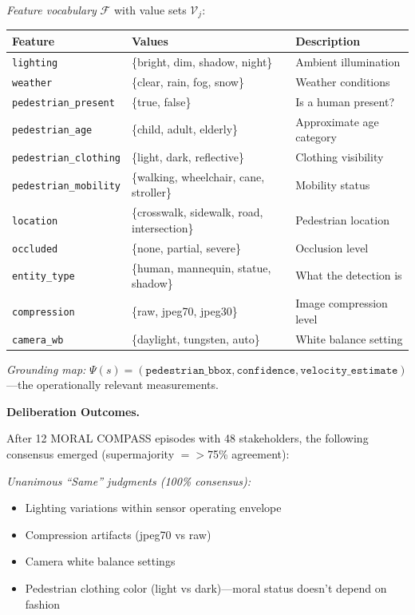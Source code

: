 \documentclass[12pt]{article}
\begin{document}
\emph{Feature vocabulary} $\mathcal{F}$ with value sets $\mathcal{V}_j$:

\begin{table}[h]
\centering
\begin{tabular}{lll}
\toprule
\textbf{Feature} & \textbf{Values} & \textbf{Description} \\
\midrule
\texttt{lighting} & \{bright, dim, shadow, night\} & Ambient illumination \\
\texttt{weather} & \{clear, rain, fog, snow\} & Weather conditions \\
\texttt{pedestrian\_present} & \{true, false\} & Is a human present? \\
\texttt{pedestrian\_age} & \{child, adult, elderly\} & Approximate age category \\
\texttt{pedestrian\_clothing} & \{light, dark, reflective\} & Clothing visibility \\
\texttt{pedestrian\_mobility} & \{walking, wheelchair, cane, stroller\} & Mobility status \\
\texttt{location} & \{crosswalk, sidewalk, road, intersection\} & Pedestrian location \\
\texttt{occluded} & \{none, partial, severe\} & Occlusion level \\
\texttt{entity\_type} & \{human, mannequin, statue, shadow\} & What the detection is \\
\texttt{compression} & \{raw, jpeg70, jpeg30\} & Image compression level \\
\texttt{camera\_wb} & \{daylight, tungsten, auto\} & White balance setting \\
\bottomrule
\end{tabular}
\end{table}

\emph{Grounding map:} $\Psi(s) = (\texttt{pedestrian\_bbox}, \texttt{confidence}, \texttt{velocity\_estimate})$---the operationally relevant measurements.

\textbf{Deliberation Outcomes.}

After 12 MORAL COMPASS episodes with 48 stakeholders, the following consensus emerged
(supermajority $= >$75\% agreement):

\emph{Unanimous ``Same'' judgments (100\% consensus):}
\begin{itemize}
\item Lighting variations within sensor operating envelope
\item Compression artifacts (jpeg70 vs raw)
\item Camera white balance settings
\item Pedestrian clothing color (light vs dark)---moral status doesn't depend on fashion
\end{itemize}
\end{document}
